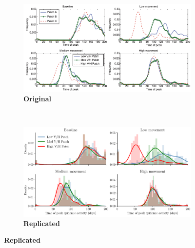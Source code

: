 \begin{figure}[htbp]
     \centering
     \begin{subfigure}[b]{\textwidth}
         \centering
         \includegraphics[width=\textwidth]{figures/ch3/manore_2.png}
         \caption{\textbf{Original}}
         \label{fig:validation-2i}
     \end{subfigure}%
     \\
     \begin{subfigure}[b]{\textwidth}
         \centering
         \includegraphics[width=\textwidth]{figures/ch3/validation_2.pdf}
         \caption{\textbf{Replicated}}
         \label{fig:validation-2ii}
     \end{subfigure}%
    \label{fig:validation-2}
\end{figure}

